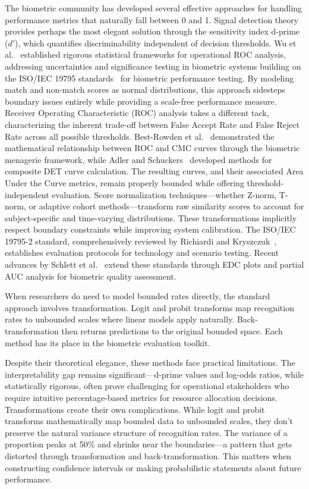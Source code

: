 \documentclass[10pt,journal,compsoc]{IEEEtran}
\begin{document}
The biometric community has developed several effective approaches for handling performance metrics that naturally fall between 0 and 1. Signal detection theory provides perhaps the most elegant solution through the sensitivity index d-prime ($d'$), which quantifies discriminability independent of decision thresholds. Wu et al.~\cite{wu2011} established rigorous statistical frameworks for operational ROC analysis, addressing uncertainties and significance testing in biometric systems building on the ISO/IEC 19795 standards~\cite{garris2005} for biometric performance testing. By modeling match and non-match scores as normal distributions, this approach sidesteps boundary issues entirely while providing a scale-free performance measure. Receiver Operating Characteristic (ROC) analysis takes a different tack, characterizing the inherent trade-off between False Accept Rate and False Reject Rate across all possible thresholds. Best-Rowden et al.~\cite{bestrowden2013} demonstrated the mathematical relationship between ROC and CMC curves through the biometric menagerie framework, while Adler and Schuckers~\cite{adler2005} developed methods for composite DET curve calculation. The resulting curves, and their associated Area Under the Curve metrics, remain properly bounded while offering threshold-independent evaluation. Score normalization techniques---whether Z-norm, T-norm, or adaptive cohort methods---transform raw similarity scores to account for subject-specific and time-varying distributions. These transformations implicitly respect boundary constraints while improving system calibration. The ISO/IEC 19795-2 standard, comprehensively reviewed by Richiardi and Kryszczuk~\cite{richiardi2011}, establishes evaluation protocols for technology and scenario testing. Recent advances by Schlett et al.~\cite{schlett2024} extend these standards through EDC plots and partial AUC analysis for biometric quality assessment.

When researchers do need to model bounded rates directly, the standard approach involves transformation. Logit and probit transforms map recognition rates to unbounded scales where linear models apply naturally. Back-transformation then returns predictions to the original bounded space. Each method has its place in the biometric evaluation toolkit.

Despite their theoretical elegance, these methods face practical limitations. The interpretability gap remains significant---d-prime values and log-odds ratios, while statistically rigorous, often prove challenging for operational stakeholders who require intuitive percentage-based metrics for resource allocation decisions. Transformations create their own complications. While logit and probit transforms mathematically map bounded data to unbounded scales, they don't preserve the natural variance structure of recognition rates. The variance of a proportion peaks at 50\% and shrinks near the boundaries---a pattern that gets distorted through transformation and back-transformation. This matters when constructing confidence intervals or making probabilistic statements about future performance.
\end{document}

